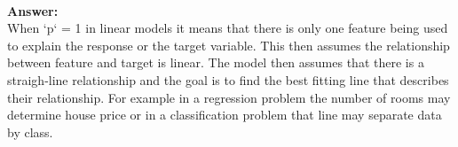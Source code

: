 \documentclass[12pt]{article}
\begin{document}

\begin{enumerate}

 \\
\textbf{Answer: } \\ 
When `p` = 1 in linear models it means that there is only one feature being used to explain the response or the target variable. This then assumes the relationship between feature and target is linear. The model then assumes that there is a straigh-line relationship and the goal is to find the best fitting line that describes their relationship. For example in a regression problem the number of rooms may determine house price or in a classification problem that line may separate data by class. \\ \\ \\ \\ \\



\end{enumerate}
\end{document}
